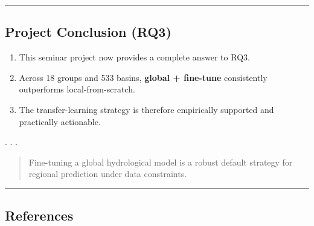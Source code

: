 \documentclass[
  letterpaper,
  DIV=11,
  numbers=noendperiod]{scrartcl}
\providecommand{\tightlist}{%
  \setlength{\itemsep}{0pt}\setlength{\parskip}{0pt}}
\begin{document}
\begin{center}\rule{0.5\linewidth}{0.5pt}\end{center}

\subsection{Project Conclusion (RQ3)}\label{project-conclusion-rq3}

\begin{enumerate}
\def\labelenumi{\arabic{enumi}.}
\tightlist
\item
  This seminar project now provides a complete answer to RQ3.
\item
  Across 18 groups and 533 basins, \textbf{global + fine-tune}
  consistently outperforms local-from-scratch.
\item
  The transfer-learning strategy is therefore empirically supported and
  practically actionable.
\end{enumerate}

. . .

\begin{quote}
Fine-tuning a global hydrological model is a robust default strategy for
regional prediction under data constraints.
\end{quote}

\begin{center}\rule{0.5\linewidth}{0.5pt}\end{center}

\subsection{References}\label{references}
\end{document}
